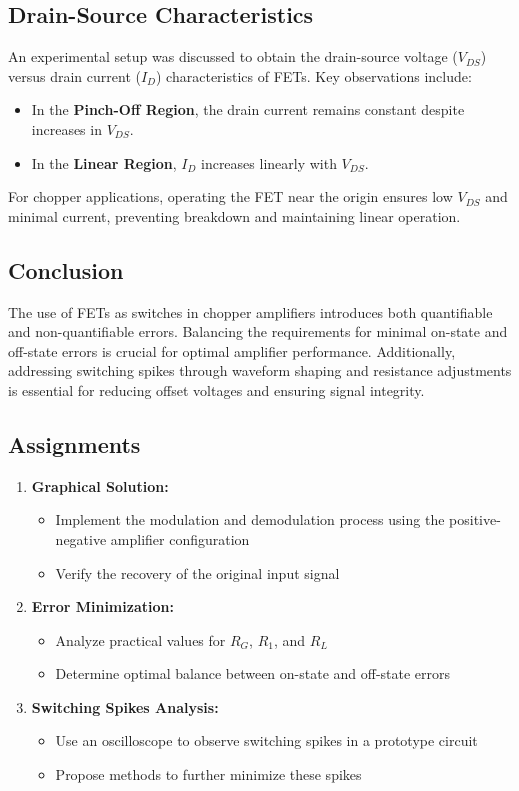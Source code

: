 \documentclass[a4paper,9pt,twoside,openany,twocolumn]{memoir}
\begin{document}
\subsection{Drain-Source Characteristics}
An experimental setup was discussed to obtain the drain-source voltage (\( V_{DS} \)) versus drain current (\( I_D \)) characteristics of FETs. Key observations include:
\begin{itemize}
    \item In the \textbf{Pinch-Off Region}, the drain current remains constant despite increases in \( V_{DS} \).
    \item In the \textbf{Linear Region}, \( I_D \) increases linearly with \( V_{DS} \).
\end{itemize}
For chopper applications, operating the FET near the origin ensures low \( V_{DS} \) and minimal current, preventing breakdown and maintaining linear operation.

\subsection{Conclusion}
The use of FETs as switches in chopper amplifiers introduces both quantifiable and non-quantifiable errors. Balancing the requirements for minimal on-state and off-state errors is crucial for optimal amplifier performance. Additionally, addressing switching spikes through waveform shaping and resistance adjustments is essential for reducing offset voltages and ensuring signal integrity.

\subsection{Assignments}
\begin{enumerate}
    \item \textbf{Graphical Solution:} 
        \begin{itemize}
            \item Implement the modulation and demodulation process using the positive-negative amplifier configuration
            \item Verify the recovery of the original input signal
        \end{itemize}
    
    \item \textbf{Error Minimization:}
        \begin{itemize} 
            \item Analyze practical values for \( R_G \), \( R_1 \), and \( R_L \)
            \item Determine optimal balance between on-state and off-state errors
        \end{itemize}
        
    \item \textbf{Switching Spikes Analysis:}
        \begin{itemize}
            \item Use an oscilloscope to observe switching spikes in a prototype circuit
            \item Propose methods to further minimize these spikes
        \end{itemize}
\end{enumerate}
\end{document}
